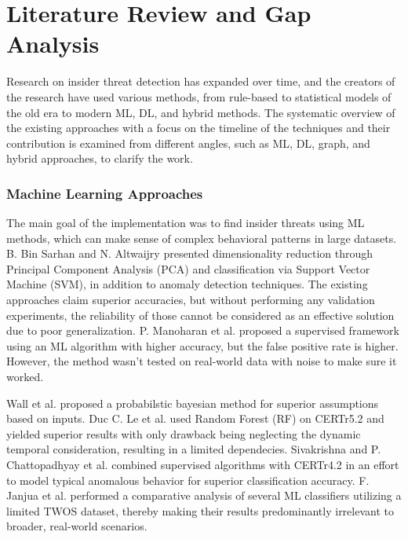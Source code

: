 \chapter{Literature Review and Gap Analysis}\label{literature}
Research on insider threat detection has expanded over time, and the creators of the research have used various methods, from rule-based to statistical models of the old era to modern ML, DL, and hybrid methods. The systematic overview of the existing approaches with a focus on the timeline of the techniques and their contribution is examined from different angles, such as ML, DL, graph, and hybrid approaches, to clarify the work.

\subsection{Machine Learning Approaches}
The main goal of the implementation was to find insider threats using ML methods, which can make sense of complex behavioral patterns in large datasets.  B. Bin Sarhan and N. Altwaijry \cite{bin2022insider} presented dimensionality reduction through Principal Component Analysis (PCA) and classification via Support Vector Machine (SVM), in addition to anomaly detection techniques.  The existing approaches claim superior accuracies, but without performing any validation experiments, the reliability of those cannot be considered as an effective solution due to poor generalization. P. Manoharan et al. \cite{manoharan2023insider} proposed a supervised framework using an ML algorithm with higher accuracy, but the false positive rate is higher. However, the method wasn't tested on real-world data with noise to make sure it worked.


 Wall et al. \cite{wall2021bayesian} proposed a probabilstic bayesian method  for superior assumptions based on inputs. Duc C. Le et al. \cite{le2020analyzing} used Random Forest (RF) on CERTr5.2 and yielded superior results with only drawback being neglecting  the dynamic temporal consideration, resulting in a limited dependecies. Sivakrishna \cite{sivakrishna2025efficient} and P. Chattopadhyay et al. \cite{chattopadhyay2018scenario} combined supervised algorithms with CERTr4.2 in an effort to model typical anomalous behavior for superior classification accuracy. F. Janjua et al. \cite{janjua2020handling} performed a comparative analysis of several ML classifiers utilizing a limited TWOS dataset, thereby making their results predominantly irrelevant to broader, real-world scenarios.

